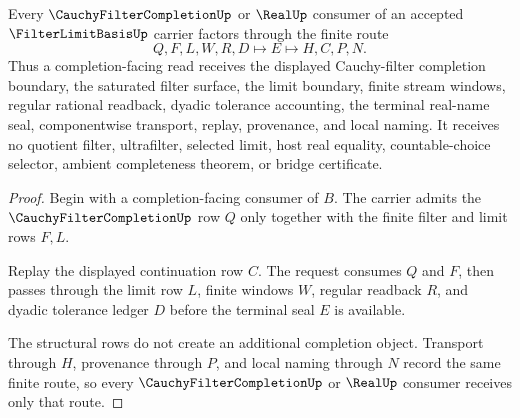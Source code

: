 \begin{theorem}
\label{thm:filter-limit-basis-cauchyfiltercompletion-handoff}
Every $\CauchyFilterCompletionUp$ or $\RealUp$ consumer of an accepted $\FilterLimitBasisUp$ carrier factors through the finite route
$$
Q,F,L,W,R,D \longmapsto E \longmapsto H,C,P,N .
$$
Thus a completion-facing read receives the displayed Cauchy-filter completion boundary, the saturated filter surface, the limit boundary, finite stream windows, regular rational readback, dyadic tolerance accounting, the terminal real-name seal, componentwise transport, replay, provenance, and local naming. It receives no quotient filter, ultrafilter, selected limit, host real equality, countable-choice selector, ambient completeness theorem, or bridge certificate.
\end{theorem}
\begin{proof}
Begin with a completion-facing consumer of $B$. The carrier admits the $\CauchyFilterCompletionUp$ row $Q$ only together with the finite filter and limit rows $F,L$.

Replay the displayed continuation row $C$. The request consumes $Q$ and $F$, then passes through the limit row $L$, finite windows $W$, regular readback $R$, and dyadic tolerance ledger $D$ before the terminal seal $E$ is available.

The structural rows do not create an additional completion object. Transport through $H$, provenance through $P$, and local naming through $N$ record the same finite route, so every $\CauchyFilterCompletionUp$ or $\RealUp$ consumer receives only that route.
\end{proof}

